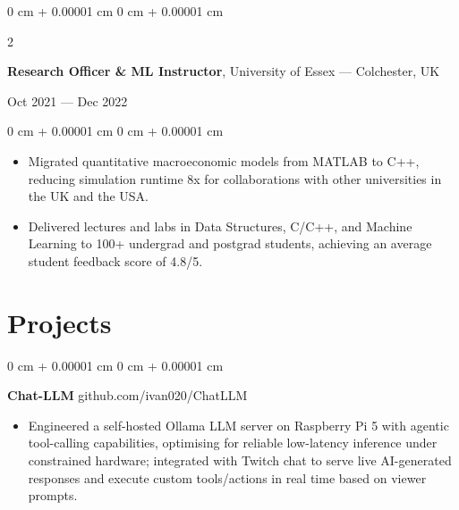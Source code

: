 \documentclass[6pt, letterpaper]{article}
\newenvironment{highlights}{
    \begin{itemize}[
        topsep=0.02 cm,
        parsep=0.02 cm,
        partopsep=0pt,
        itemsep=0pt,
        leftmargin=0 cm + 8pt
    ]
}{
    \end{itemize}
} %
\newenvironment{onecolentry}{
    \begin{adjustwidth}{
        0 cm + 0.00001 cm
    }{
        0 cm + 0.00001 cm
    }
}{
    \end{adjustwidth}
} %
\newenvironment{twocolentry}[2][]{
    \onecolentry
    \def\secondColumn{#2}
    \setcolumnwidth{\fill, 4.5 cm}
    \begin{paracol}{2}
}{
    \switchcolumn \raggedleft \secondColumn
    \end{paracol}
    \endonecolentry
} %
\begin{document}
        \begin{twocolentry}{Oct 2021 --- Dec 2022}
        \textbf{Research Officer \& ML Instructor}, University of Essex --- Colchester, UK
        \end{twocolentry}

        \begin{onecolentry}
        \begin{highlights}
        \item Migrated quantitative macroeconomic models from MATLAB to C++, reducing simulation runtime 8x for collaborations with other universities in the UK and the USA.
        \item Delivered lectures and labs in Data Structures, C/C++, and Machine Learning to 100+ undergrad and postgrad students, achieving an average student feedback score of 4.8/5.
        \end{highlights}
        \end{onecolentry}


    \section{Projects}

    \begin{onecolentry}
        \textbf{Chat-LLM} \hfill github.com/ivan020/ChatLLM

        \begin{highlights}

        \item Engineered a self-hosted Ollama LLM server on Raspberry Pi 5 with agentic tool-calling capabilities, optimising for reliable low-latency inference under constrained hardware; integrated with Twitch chat to serve live AI-generated responses and execute custom tools/actions in real time based on viewer prompts.

        \end{highlights}
    \end{onecolentry}
\end{document}
